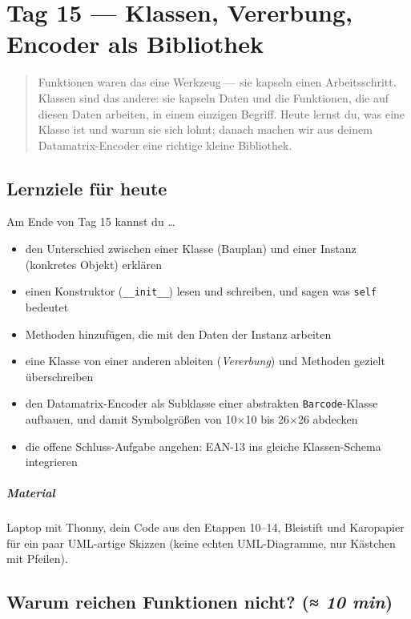 \chapter{Tag 15 — Klassen, Vererbung, Encoder als Bibliothek}

\begin{quote}
Funktionen waren das eine Werkzeug — sie kapseln einen Arbeitsschritt.
Klassen sind das andere: sie kapseln Daten und die Funktionen, die
auf diesen Daten arbeiten, in einem einzigen Begriff. Heute lernst
du, was eine Klasse ist und warum sie sich lohnt; danach machen wir
aus deinem Datamatrix-Encoder eine richtige kleine Bibliothek.
\end{quote}

\section*{Lernziele für heute}

Am Ende von Tag 15 kannst du \dots

\begin{itemize}
\item den Unterschied zwischen einer Klasse (Bauplan) und einer
  Instanz (konkretes Objekt) erklären
\item einen Konstruktor (\texttt{\_\_init\_\_}) lesen und schreiben,
  und sagen was \texttt{self} bedeutet
\item Methoden hinzufügen, die mit den Daten der Instanz arbeiten
\item eine Klasse von einer anderen ableiten (\emph{Vererbung}) und
  Methoden gezielt überschreiben
\item den Datamatrix-Encoder als Subklasse einer abstrakten
  \texttt{Barcode}-Klasse aufbauen, und damit Symbolgrößen von
  10$\times$10 bis 26$\times$26 abdecken
\item die offene Schluss-Aufgabe angehen: EAN-13 ins gleiche
  Klassen-Schema integrieren
\end{itemize}

\paragraph{Material} Laptop mit Thonny, dein Code aus den Etappen
10--14, Bleistift und Karopapier für ein paar UML-artige Skizzen
(keine echten UML-Diagramme, nur Kästchen mit Pfeilen).

\section{Warum reichen Funktionen nicht? \normalfont(\textit{≈ 10 min})}

